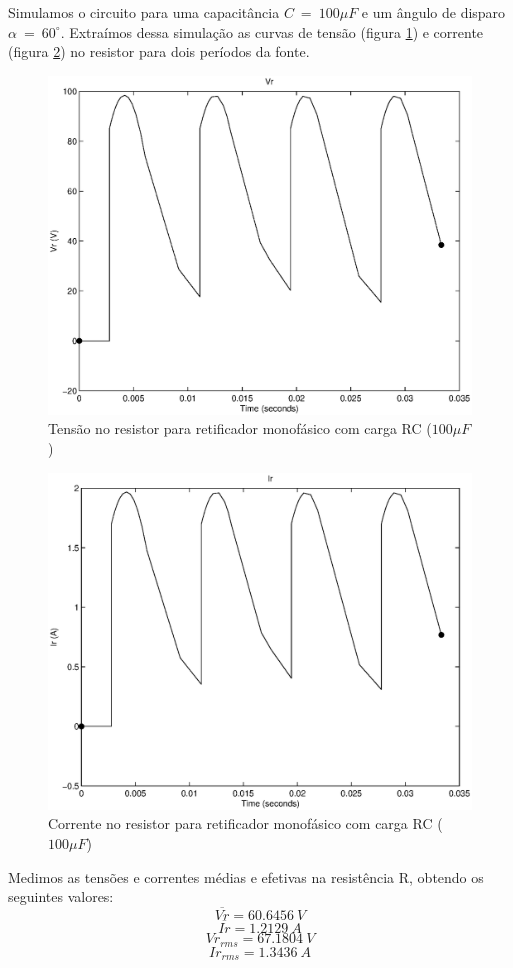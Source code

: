 \documentclass{report}
\begin{document}
Simulamos o circuito para uma capacitância $C\ =\ 100\mu F$ e um ângulo de disparo $\alpha\ =\ 60^\circ$. Extraímos dessa simulação as curvas de tensão (figura \ref{fig:rcvr}) e corrente (figura \ref{fig:rcir}) no resistor para dois períodos da fonte.
\begin{figure}[H]
	\centering
	\includegraphics[width=0.7\linewidth]{matlab/rc_vr}
	\caption{Tensão no resistor para retificador monofásico com carga RC ($100\mu F$)}
	\label{fig:rcvr}
\end{figure}
\begin{figure}[H]
	\centering
	\includegraphics[width=0.7\linewidth]{matlab/rc_ir}
	\caption{Corrente no resistor para retificador monofásico com carga RC ($100\mu F$)}
	\label{fig:rcir}
\end{figure}

Medimos as tensões e correntes médias e efetivas na resistência R, obtendo os seguintes valores:
\begin{equation}
\overline{Vr} = 60.6456\ V
\end{equation}
\begin{equation}
\overline{Ir} = 1.2129\ A
\end{equation}
\begin{equation}
Vr_{rms} = 67.1804\ V
\end{equation}
\begin{equation}
Ir_{rms} = 1.3436\ A
\end{equation}
\end{document}
